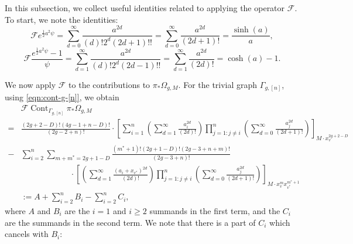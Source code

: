 \documentclass[12pt,reqno]{amsart}
\DeclareMathOperator{\Cont}{Cont}
\theoremstyle{plain}
\theoremstyle{definition}
\theoremstyle{remark}
\begin{document}
In this subsection, we collect useful identities related to applying the operator $\mathcal F$.
To start, we note the identities:
\begin{equation*}
  \mathcal F e^{\frac{1}{2} a^2\psi}
  = \sum_{d = 0}^\infty \frac{a^{2d}}{(d)! 2^d (2d + 1)!!}
  = \sum_{d = 0}^\infty \frac{a^{2d}}{(2d + 1)!}
  = \frac{\sinh(a)}{a},
\end{equation*}
\begin{equation*}
  \mathcal F \frac{e^{\frac{1}{2} a^2\psi} - 1}{\psi}
  = \sum_{d = 1}^\infty \frac{a^{2d}}{(d)! 2^d (2d - 1)!!}
  = \sum_{d = 1}^\infty \frac{a^{2d}}{(2d)!}
  = \cosh(a) - 1.
\end{equation*}

We now apply $\mathcal F$ to the contributions to $\pi_* \Omega_{g, M}$.
For the trivial graph $\Gamma_{g,[n]}$, using \eqref{eqn:cont-g-[n]}, we obtain
\begin{align*}
  &\mathcal{F}\Cont_{\Gamma_{g,[n]}}\pi_*\Omega_{g,M}\\=&\frac{(2g + 2 - D)!(4g - 1 + n - D)!}{(2g - 2 + n)!} \cdot 
    \left[\sum_{i = 1}^n \left(\sum_{d = 1}^\infty \frac{a_i^{2d}}{(2d)!}\right) \prod_{j = 1: j \neq i}^n \left(\sum_{d = 0}^\infty \frac{a_j^{2d}}{(2d + 1)!}\right) \right]_{M \cdot x_v^{2g + 2 - D}} \\
  -& \sum_{i=2}^{n}\sum_{m + m^* = 2g + 1 - D}\frac{(m^* + 1)!(2g + 1 - D)!(2g - 3 + n + m)!}{(2g - 3 + n)!} \\
  & \qquad \qquad \qquad \cdot \left[\left(\sum_{d = 1}^\infty \frac{(a_i + x_{v^*})^{2d}}{(2d)!}\right) \prod_{j=1: j\neq i}^n \left(\sum_{d = 0}^\infty \frac{a_j^{2d}}{(2d + 1)!}\right)\right]_{M \cdot x_v^m x_{v^*}^{m^* + 1}} \\
  &:= A + \sum_{i = 2}^n B_i - \sum_{i = 2}^n C_i,
\end{align*}
where $A$ and $B_i$ are the $i = 1$ and $i \ge 2$ summands in the first term, and the $C_i$ are the summands in the second term.
We note that there is a part of $C_i$ which cancels with $B_i$:
\end{document}
